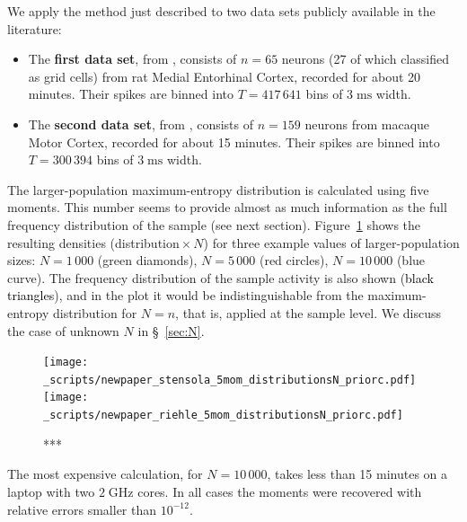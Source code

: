 \documentclass[\ifafour a4paper,12pt,\else a5paper,10pt,\fi%
onecolumn,oneside,article,%
british%
]{memoir}
\theoremstyle{remark}
\theoremstyle{innote}
\renewcommand*{\|}{\nonscript\,\vert\nonscript\;\mathopen{}}
\newcommand*{\sect}{\S}%
\newcommand*{\yAv}{A}
\newcommand*{\yA}{\yAv}%
\newcommand*{\px}{P_{\text{me}}}
\begin{document}
We apply the method just described to two data sets publicly available in
the literature:
\begin{itemize}[wide]
\item The \textbf{first data set}, from \textcite[rat
  14147]{stensolaetal2012}, consists of $n=65$ neurons (27 of which
  classified as grid cells) from rat Medial Entorhinal Cortex, recorded for
  about 20 minutes. Their spikes are binned into $T=417\,641$ bins of
  $3\;\textrm{ms}$ width.
\item The \textbf{second data set}, from \textcite[data courtesy by A.
  Riehle and T. Brochier]{rostamietal2016_r2017}, %
  consists of $n=159$ neurons from macaque Motor Cortex, recorded for about
  15 minutes. Their spikes are binned into $T=300\,394$ bins of
  $3\;\textrm{ms}$ width.
\end{itemize}


\bigskip

The larger-population maximum-entropy distribution is calculated using five
moments. This number seems to provide almost as much information as the
full frequency distribution of the sample (see next section).
Figure~\ref{fig:plots_5mom} shows the resulting densities
(distribution${}\times N$) for three example values of larger-population
sizes: $N=1\,000$ (\textcolor{mygreen}{green diamonds}), $N=5\,000$
(\textcolor{myred}{red circles}), $N=10\,000$ (\textcolor{myblue}{blue
  curve}). The frequency distribution of the sample activity is also shown
(\textcolor{black}{black triangles}), and in the plot it would be
indistinguishable from the maximum-entropy distribution for $N=n$, that is,
applied at the sample level. We discuss the case of unknown $N$ in
\sect~\ref{sec:N}.
\begin{figure}[!p]
\centering
\texttt{[image: \_scripts/newpaper\_stensola\_5mom\_distributionsN\_priorc.pdf]}%
\\[3em]%
\texttt{[image: \_scripts/newpaper\_riehle\_5mom\_distributionsN\_priorc.pdf]}%
\caption{***}
\label{fig:plots_5mom}
\end{figure}

The most expensive calculation, for $N=10\,000$, takes less than 15 minutes
on a laptop with two $2\;\textrm{GHz}$ cores. In all cases the moments were
recovered with relative errors smaller than $10^{-12}$.
\end{document}
